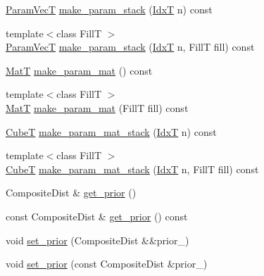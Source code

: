 \begin{DoxyCompactItemize}
\item 
\hyperlink{classmappel_1_1PointEmitterModel_add253b568d763f1513a810aac35de719}{Param\+VecT} \hyperlink{classmappel_1_1PointEmitterModel_a6c7edc7f2549058df66472cd7647cf9b}{make\+\_\+param\+\_\+stack} (\hyperlink{namespacemappel_ab17ec0f30b61ece292439d7ece81d3a8}{IdxT} n) const 
\item 
{\footnotesize template$<$class FillT $>$ }\\\hyperlink{classmappel_1_1PointEmitterModel_add253b568d763f1513a810aac35de719}{Param\+VecT} \hyperlink{classmappel_1_1PointEmitterModel_abab975b04e09e6336a930b6d8fd8c267}{make\+\_\+param\+\_\+stack} (\hyperlink{namespacemappel_ab17ec0f30b61ece292439d7ece81d3a8}{IdxT} n, FillT fill) const 
\item 
\hyperlink{namespacemappel_a7091ab87c528041f7e2027195fad8915}{MatT} \hyperlink{classmappel_1_1PointEmitterModel_a8ede9fe8e3b6a3e621c2da72e23c7f9d}{make\+\_\+param\+\_\+mat} () const 
\item 
{\footnotesize template$<$class FillT $>$ }\\\hyperlink{namespacemappel_a7091ab87c528041f7e2027195fad8915}{MatT} \hyperlink{classmappel_1_1PointEmitterModel_a68a9c537f2f2725eb8fb9d3e250dd84b}{make\+\_\+param\+\_\+mat} (FillT fill) const 
\item 
\hyperlink{namespacemappel_ab2afab4e6c8805e83946670d882768c2}{CubeT} \hyperlink{classmappel_1_1PointEmitterModel_a57b98d5f8b2b5ed2c455bbf76b632f87}{make\+\_\+param\+\_\+mat\+\_\+stack} (\hyperlink{namespacemappel_ab17ec0f30b61ece292439d7ece81d3a8}{IdxT} n) const 
\item 
{\footnotesize template$<$class FillT $>$ }\\\hyperlink{namespacemappel_ab2afab4e6c8805e83946670d882768c2}{CubeT} \hyperlink{classmappel_1_1PointEmitterModel_a2c11fa045187c7ea9ba382141b5d53c1}{make\+\_\+param\+\_\+mat\+\_\+stack} (\hyperlink{namespacemappel_ab17ec0f30b61ece292439d7ece81d3a8}{IdxT} n, FillT fill) const 
\item 
Composite\+Dist \& \hyperlink{classmappel_1_1PointEmitterModel_a2182c250c15d590b582e76594e5f06b9}{get\+\_\+prior} ()
\item 
const Composite\+Dist \& \hyperlink{classmappel_1_1PointEmitterModel_a239826b8e6b914c0cdaa293f1f5ddfd4}{get\+\_\+prior} () const 
\item 
void \hyperlink{classmappel_1_1PointEmitterModel_a8ee7d3d5b4c1ae4500f802170a958ed7}{set\+\_\+prior} (Composite\+Dist \&\&prior\+\_\+)
\item 
void \hyperlink{classmappel_1_1PointEmitterModel_acf37c5f28dc0c66197162b3408a6b815}{set\+\_\+prior} (const Composite\+Dist \&prior\+\_\+)

\end{DoxyCompactItemize}
